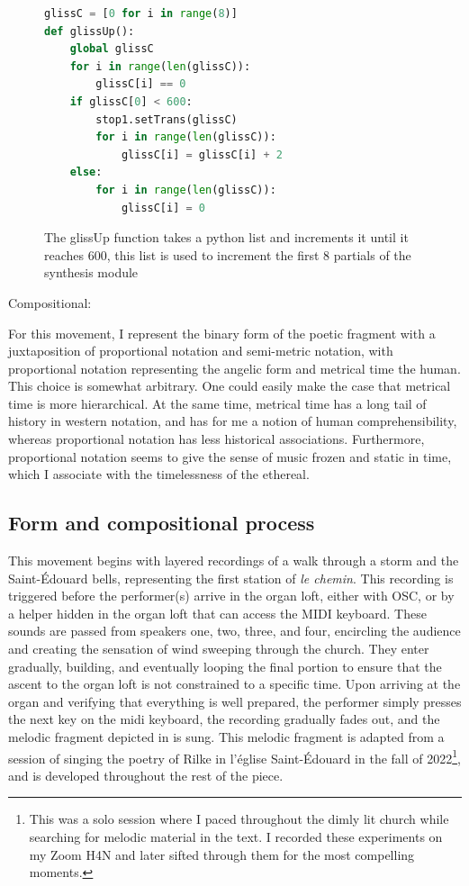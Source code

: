\documentclass[12pt,twoside,maitrise]{dms_ks}
\theoremstyle{definition}
\begin{document}
{{%

\begin{figure}[H]
\begin{lstlisting}[language=Python]
glissC = [0 for i in range(8)]
def glissUp():
    global glissC
    for i in range(len(glissC)):
        glissC[i] == 0
    if glissC[0] < 600:
        stop1.setTrans(glissC)
        for i in range(len(glissC)):
            glissC[i] = glissC[i] + 2
    else:
        for i in range(len(glissC)):
            glissC[i] = 0
\end{lstlisting}
\caption{The glissUp function takes a python list and increments it until it reaches 600, this list is used to increment the first 8 partials of the synthesis module}
\label{fig:glissup}
\end{figure}

Compositional:

For this movement, I represent the binary form of the poetic fragment with a juxtaposition of proportional notation and semi-metric notation, with proportional notation representing the angelic form and metrical time the human.
This choice is somewhat arbitrary.
One could easily make the case that metrical time is more hierarchical.
At the same time, metrical time has a long tail of history in western notation, and has for me a notion of human comprehensibility, whereas proportional notation has less historical associations.
Furthermore, proportional notation seems to give the sense of music frozen and static in time, which I associate with the timelessness of the ethereal.

\subsection{Form and compositional process}

This movement begins with layered recordings of a walk through a storm and the Saint-Édouard bells, representing the first station of \textit{le chemin}.
This recording is triggered before the performer(s) arrive in the organ loft, either with OSC, or by a helper hidden in the organ loft that can access the MIDI keyboard.  
These sounds are passed from speakers one, two, three, and four, encircling the audience and creating the sensation of wind sweeping through the church. 
They enter gradually, building, and eventually looping the final portion to ensure that the ascent to the organ loft is not constrained to a specific time. 
Upon arriving at the organ and verifying that everything is well prepared, the performer simply presses the next key on the midi keyboard, the recording gradually fades out, and the melodic fragment depicted in  is sung.
This melodic fragment is adapted from a session of singing the poetry of Rilke in l'église Saint-Édouard in the fall of 2022\footnote{This was a solo session where I paced throughout the dimly lit church while searching for melodic material in the text. I recorded these experiments on my Zoom H4N and later sifted through them for the most compelling moments.}, and is developed throughout the rest of the piece.

}}
\end{document}
